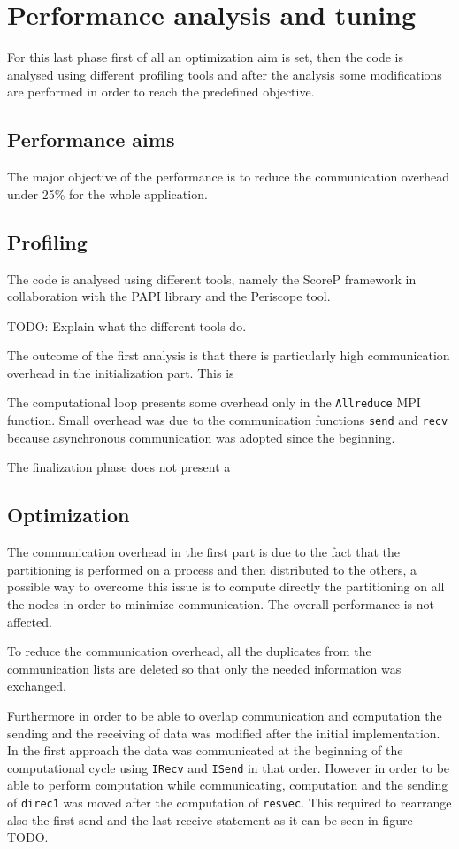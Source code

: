 \documentclass[12pt, a4paper]{article}
\begin{document}
\clearpage

\section{Performance analysis and tuning}
For this last phase first of all an optimization aim is set, then the code is
analysed using different profiling tools and after the analysis some
modifications are performed in order to reach the predefined objective.

\subsection*{Performance aims}
The major objective of the performance is to reduce the communication overhead
under 25\% for the whole application. 

\subsection*{Profiling}
The code is analysed using different tools, namely the ScoreP framework in 
collaboration with the PAPI library and the Periscope tool.

TODO: Explain what the different tools do.

The outcome of the first analysis is that there is particularly high
communication overhead in the initialization part. This is 

The computational loop presents some overhead only in the \verb=Allreduce= MPI
function. Small overhead was due to the communication functions \verb=send= and
\verb=recv= because asynchronous communication was adopted since the beginning.

The finalization phase does not present a

\subsection*{Optimization}
The communication overhead in the first part is due to the fact that the
partitioning is performed on a process and then distributed to the others, a
possible way to overcome this issue is to compute directly the partitioning on
all the nodes in order to minimize communication. The overall performance is not
affected.

To reduce the communication overhead, all the duplicates from the communication
lists are deleted so that only the needed information was exchanged.

Furthermore in order to be able to overlap communication and computation the
sending and the receiving of data was modified after the initial implementation.
In the first approach the data was communicated at the beginning of the
computational cycle using \verb=IRecv= and \verb=ISend= in that order. However
in order to be able to perform computation while communicating, computation and
the sending of \verb=direc1= was moved after the computation of \verb=resvec=.
This required to rearrange also the first send and the last receive statement as
it can be seen in figure TODO.
\end{document}

